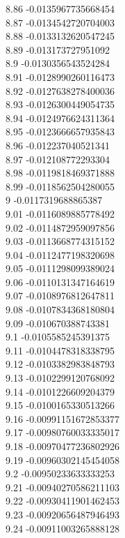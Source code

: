 {8.86	-0.0135967735668454\\
8.87	-0.0134542720704003\\
8.88	-0.0133132620547245\\
8.89	-0.013173727951092\\
8.9	-0.0130356543524284\\
8.91	-0.0128990260116473\\
8.92	-0.0127638278400036\\
8.93	-0.0126300449054735\\
8.94	-0.0124976624311364\\
8.95	-0.0123666657935843\\
8.96	-0.012237040521341\\
8.97	-0.012108772293304\\
8.98	-0.0119818469371888\\
8.99	-0.0118562504280055\\
9	-0.0117319688865387\\
9.01	-0.0116089885778492\\
9.02	-0.0114872959097856\\
9.03	-0.0113668774315152\\
9.04	-0.0112477198320698\\
9.05	-0.0111298099389024\\
9.06	-0.0110131347164619\\
9.07	-0.0108976812647811\\
9.08	-0.0107834368180804\\
9.09	-0.010670388743381\\
9.1	-0.0105585245391375\\
9.11	-0.0104478318338795\\
9.12	-0.0103382983848793\\
9.13	-0.0102299120768092\\
9.14	-0.0101226609204379\\
9.15	-0.0100165330513266\\
9.16	-0.00991151672853377\\
9.17	-0.00980760033335017\\
9.18	-0.00970477236802926\\
9.19	-0.00960302145454058\\
9.2	-0.00950233633333253\\
9.21	-0.00940270586211103\\
9.22	-0.00930411901462453\\
9.23	-0.00920656487946493\\
9.24	-0.00911003265888128\\
}
